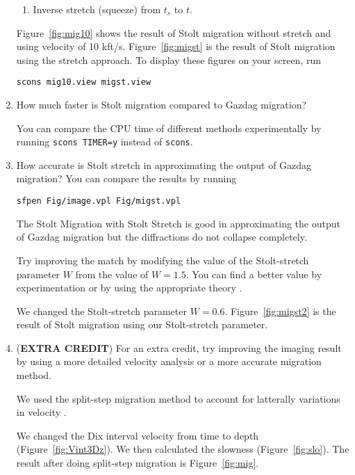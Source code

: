 \begin{enumerate}
\begin{enumerate}
\item Inverse stretch (squeeze) from $t_s$ to $t$.
\end{enumerate} 

Figure~\ref{fig:mig10} shows the result of Stolt migration without stretch and using velocity of 10 kft/s. Figure~\ref{fig:migst} is the result of Stolt migration using the stretch approach. To display these figures on your screen, run
\begin{verbatim}
scons mig10.view migst.view
\end{verbatim}

\item How much faster is Stolt migration compared to Gazdag migration? 

You can compare the CPU time of different methods experimentally by
running \texttt{scons TIMER=y} instead of \texttt{scons}.


\item How accurate is Stolt stretch in approximating the output of Gazdag migration? You can compare the results by running
\begin{verbatim}
sfpen Fig/image.vpl Fig/migst.vpl
\end{verbatim}

The Stolt Migration with Stolt Stretch is good in approximating the output of Gazdag migration but the diffractions do not collapse completely.

Try improving the match by modifying the value of the Stolt-stretch parameter $W$ from the value of $W=1.5$. You can find a better value by experimentation or by using the appropriate theory \cite[]{stoltst}.

We changed the Stolt-stretch parameter $W=0.6$. Figure~\ref{fig:migst2} is the result of Stolt migration using our Stolt-stretch parameter.


\item (\textbf{EXTRA CREDIT}) For an extra credit, try improving the imaging result by using a more detailed velocity analysis or a more accurate migration method.

We used the split-step migration method to account for latterally variations in velocity \cite[]{splitstep}.
 
We changed the Dix interval velocity from time to depth (Figure~\ref{fig:Vint3Dz}). We then calculated the slowness (Figure~\ref{fig:slo}). 
The result after doing split-step migration is Figure~\ref{fig:mig}.


\end{enumerate}

